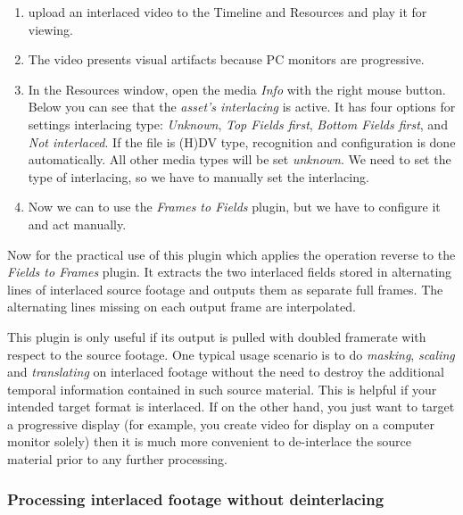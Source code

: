 \begin{enumerate}
    \item upload an interlaced video to the Timeline and Resources and play it for viewing.
    \item The video presents visual artifacts because PC monitors are progressive.
    \item In the Resources window, open the media \textit{Info} with the right mouse button. Below you can see that the \textit{asset's interlacing} is active. It has four options for settings interlacing type: \textit{Unknown}, \textit{Top Fields first}, \textit{Bottom Fields first}, and \textit{Not interlaced}. If the file is (H)DV type, recognition and configuration is done automatically. All other media types will be set \textit{unknown}. We need to set the type of interlacing, so we have to manually set the interlacing.  
    \item Now we can to use the \textit{Frames to Fields} plugin, but we have to configure it and act manually.
\end{enumerate}

Now for the practical use of this plugin which applies the operation reverse to the \textit{Fields to Frames} plugin. It extracts the two interlaced fields stored in alternating lines of interlaced source footage and outputs them as separate full frames. The alternating lines missing on each output frame are interpolated.

This plugin is only useful if its output is pulled with doubled framerate with respect to the source footage. One typical usage scenario is to do \textit{masking}, \textit{scaling} and \textit{translating} on interlaced footage without the need to destroy the additional temporal information contained in such source material. This is helpful if your intended target format is interlaced. If on the other hand, you just want to target a progressive display (for example, you create video for display on a computer monitor solely) then it is much more convenient to de-interlace the source material prior to any further processing.

\subsubsection*{Processing interlaced footage without deinterlacing}
\label{ssub:processing_interlace_footage}

